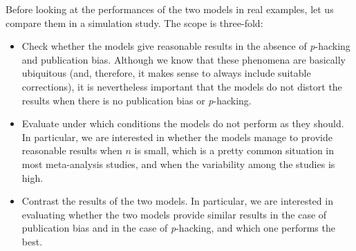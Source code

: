 \documentclass{article}
\theoremstyle{plain}
\theoremstyle{definition}
\begin{document}
%
%
Before looking at the performances of the two models in real examples, let us compare them in a simulation study. The scope is three-fold:
\begin{itemize}
\item Check whether the models give reasonable results in the absence of \textit{p}-hacking and publication bias. Although we know that these phenomena are basically ubiquitous (and, therefore, it makes sense to always include suitable corrections), it is nevertheless important that the models do not distort the results when there is no publication bias or \textit{p}-hacking.
\item Evaluate under which conditions the models do not perform as they should. In particular, we are interested in whether the models manage to provide reasonable results when $n$ is small, which is a pretty common situation in most meta-analysis studies, and when the variability among the studies is high.
\item Contrast the results of the two models. In particular, we are interested in evaluating whether the two models provide similar results in the case of publication bias and in the case of \textit{p}-hacking, and which one performs the best.
\end{itemize}
\end{document}
